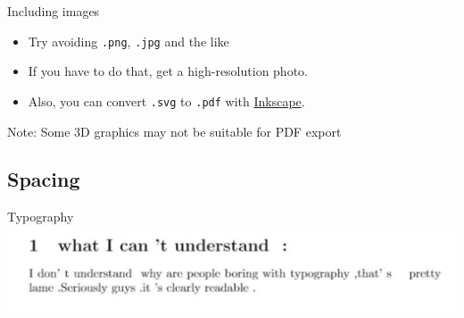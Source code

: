 \documentclass[aspectratio=169]{beamer}
\begin{document}
	\begin{frame}{Including images}
		\textbf{}
		\begin{itemize}
			\item Try avoiding \texttt{.png}, \texttt{.jpg} and the like
			\item If you have to do that, get a high-resolution photo.
			\item Also, you can convert \texttt{.svg} to \texttt{.pdf} with \href{https://inkscape.org/}{Inkscape}.
		\end{itemize}
	
	
		\alert{Note:} Some 3D graphics may not be suitable for PDF export
	\end{frame}
	
	\subsection{Spacing}
	
	\begin{frame}{Typography}
		\includegraphics[width=\textwidth]{pasted image 0}
		
	\end{frame}
	
\end{document}
